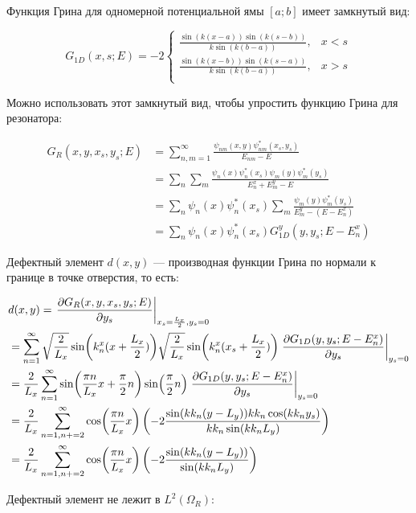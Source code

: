 Функция Грина для одномерной потенциальной ямы $[a; b]$ имеет замкнутый вид:

$$G_{1D}(x, s; E) = - 2 \begin{cases}
\frac{\sin(k(x - a)) \sin(k(s - b))}{k \sin(k(b - a))}, & x < s \\
\frac{\sin(k(x - b)) \sin(k(s - a))}{k \sin(k(b - a))}, & x > s \\
\end{cases}$$

Можно использовать этот замкнутый вид, чтобы упростить функцию Грина для резонатора:

\begin{align*}
G_R(x, y, x_s, y_s; E)
&= \sum\limits_{n, m = 1}^\infty \frac{\psi_{nm}(x, y) \psi^*_{nm}(x_s, y_s)}{E_{nm} - E} \\
&= \sum\limits_n \sum\limits_m \frac{\psi_n(x) \psi_n^*(x_s) \psi_m(y) \psi_m^*(y_s)}{E^x_n + E^y_m - E} \\
&= \sum\limits_n \psi_n(x) \psi_n^*(x_s) \sum\limits_m \frac{\psi_m(y) \psi_m^*(y_s)}{E^y_m - (E - E^x_n)} \\
&= \sum\limits_n \psi_n(x) \psi^*_n(x_s) G^y_{1D}(y, y_s; E - E^x_n)
\end{align*}

Дефектный элемент $d(x, y)$ — производная функции Грина по нормали к границе в точке отверстия, то есть:

\begin{align*}
& d(x, y) = \eval{\pdv{G_R(x, y, x_s, y_s; E)}{y_s}}_{x_s = \frac{L_x}{2}, y_s = 0} \\
&= \sum\limits_{n = 1}^\infty
\sqrt{\frac{2}{L_x}} \sin(k_n^x (x + \frac{L_x}{2}))
\sqrt{\frac{2}{L_x}} \sin(k_n^x (x_s + \frac{L_x}{2}))
\eval{\pdv{G_{1D}(y, y_s; E - E^x_n)}{y_s}}_{y_s = 0} \\
&= \frac{2}{L_x} \sum\limits_{n = 1}^\infty
\sin(\frac{\pi n}{L_x} x + \frac{\pi}{2} n)
\sin(\frac{\pi}{2} n)
\eval{\pdv{G_{1D}(y, y_s; E - E^x_n)}{y_s}}_{y_s = 0} \\
&= \frac{2}{L_x} \sum\limits_{n = 1, n += 2}^\infty
\cos(\frac{\pi n}{L_x} x)
\left(-2\frac{\sin(kk_n(y - L_y)) kk_n \cos(kk_n y_s)}{kk_n \sin(kk_n L_y)}\right) \\
&= \frac{2}{L_x} \sum\limits_{n = 1, n += 2}^\infty
\cos(\frac{\pi n}{L_x} x)
\left(-2\frac{\sin(kk_n(y - L_y))}{\sin(kk_n L_y)}\right)
\end{align*}

Дефектный элемент не лежит в $L^2(\Omega_R)$:

